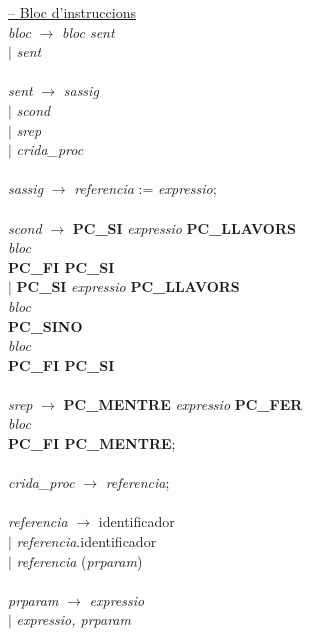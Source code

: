 \documentclass[10pt]{report}
\begin{document}
\begin{tabbing}
        
        \underline{-- Bloc d'instruccions} \\
        \textit{bloc} \> $\rightarrow$ \> \textit{bloc sent} \\
        \> $\mid$ \> \textit{sent} \\
        \\
        \textit{sent} \> $\rightarrow$ \> \textit{sassig} \\
        \> $\mid$ \> \textit{scond} \\
        \> $\mid$ \> \textit{srep} \\
        \> $\mid$ \> \textit{crida\_proc} \\
        \\
        
        \textit{sassig} \> $\rightarrow$ \> \textit{referencia} := \textit{expressio}; \\
        \\
        
        \textit{scond} \> $\rightarrow$ \> \textbf{PC\_SI} \textit{expressio} \textbf{PC\_LLAVORS} \\
        \> \> \>  \textit{bloc} \\
        \> \> \textbf{PC\_FI PC\_SI} \\
        \> $\mid$ \> \textbf{PC\_SI} \textit{expressio} \textbf{PC\_LLAVORS} \\
        \> \> \> \textit{bloc} \\
        \> \> \textbf{PC\_SINO} \\
        \> \> \> \textit{bloc} \\
        \> \> \textbf{PC\_FI PC\_SI}\\
        \\
        
        \textit{srep} \> $\rightarrow$ \> \textbf{PC\_MENTRE} \textit{expressio} \textbf{PC\_FER} \\
        \> \> \> \textit{bloc} \\
        \> \> \textbf{PC\_FI PC\_MENTRE}; \\
        \\
        
        \textit{crida\_proc} \> $\rightarrow$ \> \textit{referencia}; \\
        \\
        \textit{referencia} \> $\rightarrow$ \> identificador \\
        \> $\mid$ \> \textit{referencia}.identificador \\
        \> $\mid$ \> \textit{referencia} (\textit{prparam}) \\
        \\
        \textit{prparam} \> $\rightarrow$ \> \textit{expressio} \\
        \> $\mid$ \> \textit{expressio, prparam} \\
        \\
        

\end{tabbing}
\end{document}
